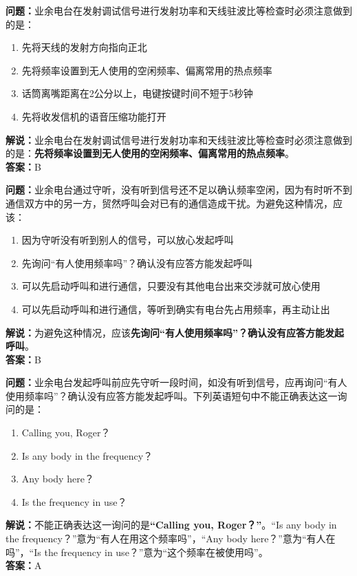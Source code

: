 \documentclass{ctexbook}
\begin{document}
\bigskip


\noindent\textbf{问题：}业余电台在发射调试信号进行发射功率和天线驻波比等检查时必须注意做到的是：
\begin{enumerate}[label=\Alph*), leftmargin=3em]	
	\item 先将天线的发射方向指向正北
	\item 先将频率设置到无人使用的空闲频率、偏离常用的热点频率
	\item 话筒离嘴距离在2公分以上，电键按键时间不短于5秒钟
	\item 先将收发信机的语音压缩功能打开
\end{enumerate}
\noindent\textbf{解说：}业余电台在发射调试信号进行发射功率和天线驻波比等检查时必须注意做到的是：\textbf{先将频率设置到无人使用的空闲频率、偏离常用的热点频率}。\\\noindent\textbf{答案：}B

\bigskip


\noindent\textbf{问题：}业余电台通过守听，没有听到信号还不足以确认频率空闲，因为有时听不到通信双方中的另一方，贸然呼叫会对已有的通信造成干扰。为避免这种情况，应该：
\begin{enumerate}[label=\Alph*), leftmargin=3em]	
	\item 因为守听没有听到别人的信号，可以放心发起呼叫
	\item 先询问“有人使用频率吗”？确认没有应答方能发起呼叫
	\item 可以先启动呼叫和进行通信，只要没有其他电台出来交涉就可放心使用
	\item 可以先启动呼叫和进行通信，等听到确实有电台先占用频率，再主动让出
\end{enumerate}
\noindent\textbf{解说：}为避免这种情况，应该\textbf{先询问“有人使用频率吗”？确认没有应答方能发起呼叫}。\\\noindent\textbf{答案：}B


\bigskip


\noindent\textbf{问题：}业余电台发起呼叫前应先守听一段时间，如没有听到信号，应再询问“有人使用频率吗”？确认没有应答方能发起呼叫。下列英语短句中不能正确表达这一询问的是：
\begin{enumerate}[label=\Alph*), leftmargin=3em]
	\item Calling you, Roger？
	\item Is any body in the frequency？
	\item Any body here？
	\item Is the frequency in use？
\end{enumerate}
\noindent\textbf{解说：}不能正确表达这一询问的是\textbf{“Calling you, Roger？”}。“Is any body in the frequency？”意为“有人在用这个频率吗”，“Any body here？”意为“有人在吗”，“Is the frequency in use？”意为“这个频率在被使用吗”。\\\noindent\textbf{答案：}A
\end{document}
